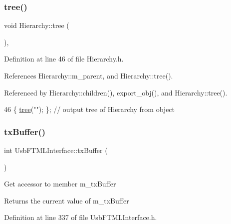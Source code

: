 \subsubsection{\texorpdfstring{tree()}{tree()}\hspace{0.1cm}{\footnotesize\ttfamily [2/2]}}
{\footnotesize\ttfamily void Hierarchy\+::tree (\begin{DoxyParamCaption}{ }\end{DoxyParamCaption})\hspace{0.3cm}{\ttfamily [inline]}, {\ttfamily [inherited]}}



Definition at line 46 of file Hierarchy.\+h.



References Hierarchy\+::m\+\_\+parent, and Hierarchy\+::tree().



Referenced by Hierarchy\+::children(), export\+\_\+obj(), and Hierarchy\+::tree().


\begin{DoxyCode}
46 \{ \hyperlink{classHierarchy_a594c294c5f60c230e106d522ed008212}{tree}(\textcolor{stringliteral}{""}); \};                     \textcolor{comment}{// output tree of Hierarchy from object}
\end{DoxyCode}
\mbox{\label{classUsbFTMLInterface_ada338c9311fdb6d788a951f41cf9101f}} 
\subsubsection{\texorpdfstring{tx\+Buffer()}{txBuffer()}}
{\footnotesize\ttfamily int Usb\+F\+T\+M\+L\+Interface\+::tx\+Buffer (\begin{DoxyParamCaption}{ }\end{DoxyParamCaption})\hspace{0.3cm}{\ttfamily [inline]}}

Get accessor to member m\+\_\+tx\+Buffer \begin{DoxyReturn}{Returns}
the current value of m\+\_\+tx\+Buffer 
\end{DoxyReturn}


Definition at line 337 of file Usb\+F\+T\+M\+L\+Interface.\+h.



